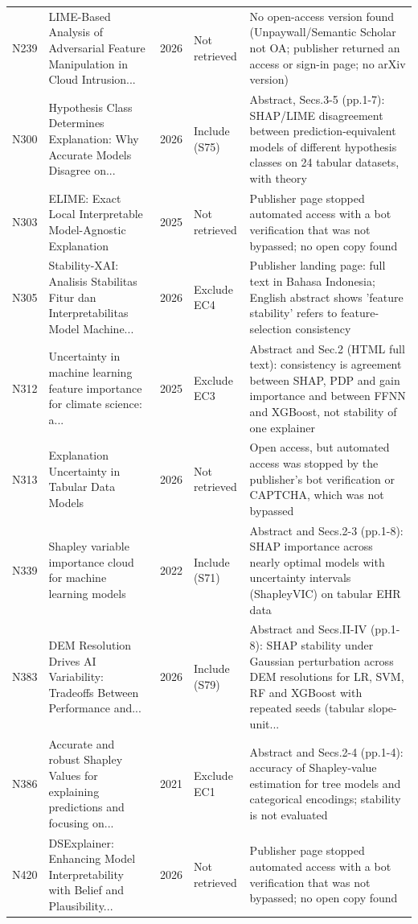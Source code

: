\begin{longtable}{@{}P{1.0cm}P{6.3cm}P{0.7cm}P{1.6cm}P{6.1cm}@{}}
N239 & LIME-Based Analysis of Adversarial Feature Manipulation in Cloud Intrusion... & 2026 & Not retrieved & No open-access version found (Unpaywall/\allowbreak{}Semantic Scholar not OA; publisher returned an access or sign-in page; no arXiv version) \\
N300 & Hypothesis Class Determines Explanation: Why Accurate Models Disagree on... & 2026 & Include (S75) & Abstract, Secs.3-5 (pp.1-7): SHAP/\allowbreak{}LIME disagreement between prediction-equivalent models of different hypothesis classes on 24 tabular datasets, with theory \\
N303 & ELIME: Exact Local Interpretable Model-Agnostic Explanation & 2025 & Not retrieved & Publisher page stopped automated access with a bot verification that was not bypassed; no open copy found \\
N305 & Stability-XAI: Analisis Stabilitas Fitur dan Interpretabilitas Model Machine... & 2026 & Exclude EC4 & Publisher landing page: full text in Bahasa Indonesia; English abstract shows 'feature stability' refers to feature-selection consistency \\
N312 & Uncertainty in machine learning feature importance for climate science: a... & 2025 & Exclude EC3 & Abstract and Sec.2 (HTML full text): consistency is agreement between SHAP, PDP and gain importance and between FFNN and XGBoost, not stability of one explainer \\
N313 & Explanation Uncertainty in Tabular Data Models & 2026 & Not retrieved & Open access, but automated access was stopped by the publisher's bot verification or CAPTCHA, which was not bypassed \\
N339 & Shapley variable importance cloud for machine learning models & 2022 & Include (S71) & Abstract and Secs.2-3 (pp.1-8): SHAP importance across nearly optimal models with uncertainty intervals (ShapleyVIC) on tabular EHR data \\
N383 & DEM Resolution Drives AI Variability: Tradeoffs Between Performance and... & 2026 & Include (S79) & Abstract and Secs.II-IV (pp.1-8): SHAP stability under Gaussian perturbation across DEM resolutions for LR, SVM, RF and XGBoost with repeated seeds (tabular slope-unit... \\
N386 & Accurate and robust Shapley Values for explaining predictions and focusing on... & 2021 & Exclude EC1 & Abstract and Secs.2-4 (pp.1-4): accuracy of Shapley-value estimation for tree models and categorical encodings; stability is not evaluated \\
N420 & DSExplainer: Enhancing Model Interpretability with Belief and Plausibility... & 2026 & Not retrieved & Publisher page stopped automated access with a bot verification that was not bypassed; no open copy found \\

\end{longtable}
